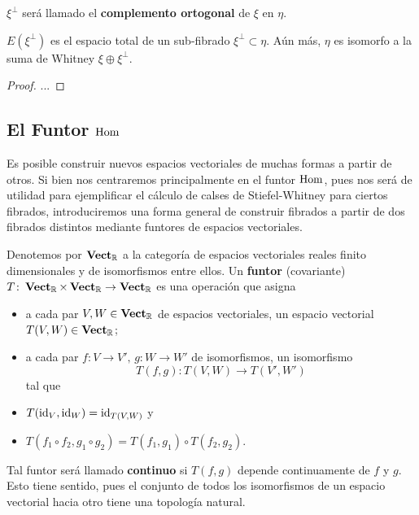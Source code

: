\begin{definition}
	$\xi^{\perp}$ será llamado el \textbf{complemento ortogonal} de $\xi$ en $\eta$.
\end{definition}

\begin{theorem}
	$E(\xi^{\perp})$ es el espacio total de un sub-fibrado $\xi^{\perp} \subset \eta$. Aún más, $\eta$ es isomorfo a la suma de Whitney $\xi \oplus \xi^{\perp}$.
\end{theorem}
\begin{proof}
	...
\end{proof}

\subsection{El Funtor $\operatorname{Hom}$}

Es posible construir nuevos espacios vectoriales de muchas formas a partir de otros. Si bien nos centraremos principalmente en el funtor $\operatorname{Hom}$, pues nos será de utilidad para ejemplificar el cálculo de calses de Stiefel-Whitney para ciertos fibrados, introduciremos una forma general de construir fibrados a partir de dos fibrados distintos mediante funtores de espacios vectoriales.

\begin{definition}
	Denotemos por $\operatorname{\mathbf{Vect}}_{\mathbb{R}}$ a la categoría de espacios vectoriales reales finito dimensionales y de isomorfismos entre ellos. Un \textbf{funtor} (covariante) $T \colon \operatorname{\mathbf{Vect}}_{\mathbb{R}} \times \operatorname{\mathbf{Vect}}_{\mathbb{R}} \to \operatorname{\mathbf{Vect}}_{\mathbb{R}}$ es una operación que asigna
	\begin{itemize}
		\item[1.] a cada par $V,W \in \operatorname{\mathbf{Vect}}_{\mathbb{R}}$ de espacios vectoriales, un espacio vectorial $T(V,W) \in \operatorname{\mathbf{Vect}}_{\mathbb{R}}$;

		\item[2.] a cada par $f \colon V \to V',\, g \colon W \to W'$ de isomorfismos, un isomorfismo
		\[ T(f,g) \colon T(V,W) \to T(V',W') \]
		tal que

		\item[3.] $T(\operatorname{id}_{V}, \operatorname{id}_{W}) = \operatorname{id}_{T(V,W)}$ y

		\item[4.] $T(f_{1} \circ f_{2}, g_{1} \circ g_{2}) = T(f_{1}, g_{1}) \circ T(f_{2},g_{2})$.
	\end{itemize}
	Tal funtor será llamado \textbf{continuo} si $T(f,g)$ depende continuamente de $f$ y $g$. Esto tiene sentido, pues el conjunto de todos los isomorfismos de un espacio vectorial hacia otro tiene una topología natural.
\end{definition}

